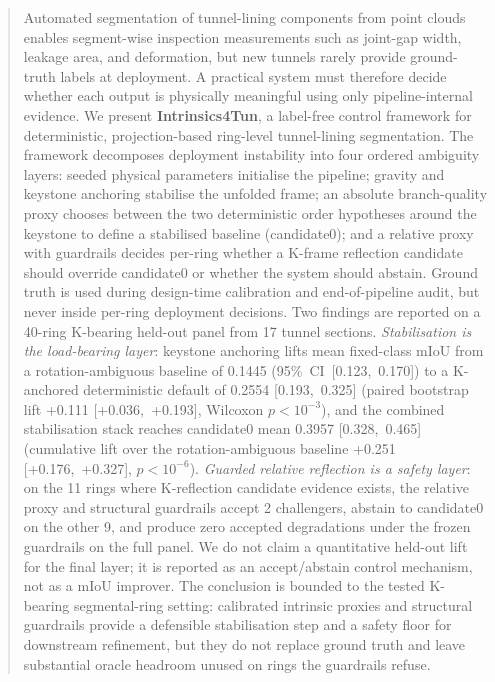 \documentclass[a4paper,fleqn]{cas-dc}
\begin{document}
{\begin{abstract}
Automated segmentation of tunnel-lining components from point clouds enables segment-wise inspection measurements such as joint-gap width, leakage area, and deformation, but new tunnels rarely provide ground-truth labels at deployment. A practical system must therefore decide whether each output is physically meaningful using only pipeline-internal evidence. We present \textbf{Intrinsics4Tun}, a label-free control framework for deterministic, projection-based ring-level tunnel-lining segmentation. The framework decomposes deployment instability into four ordered ambiguity layers: seeded physical parameters initialise the pipeline; gravity and keystone anchoring stabilise the unfolded frame; an absolute branch-quality proxy chooses between the two deterministic order hypotheses around the keystone to define a stabilised baseline (candidate0); and a relative proxy with guardrails decides per-ring whether a K-frame reflection candidate should override candidate0 or whether the system should abstain. Ground truth is used during design-time calibration and end-of-pipeline audit, but never inside per-ring deployment decisions. Two findings are reported on a 40-ring K-bearing held-out panel from 17 tunnel sections. \emph{Stabilisation is the load-bearing layer}: keystone anchoring lifts mean fixed-class mIoU from a rotation-ambiguous baseline of 0.1445 (95\%~CI~[0.123,~0.170]) to a K-anchored deterministic default of 0.2554 [0.193,~0.325] (paired bootstrap lift +0.111 [+0.036,~+0.193], Wilcoxon $p<10^{-3}$), and the combined stabilisation stack reaches candidate0 mean 0.3957 [0.328,~0.465] (cumulative lift over the rotation-ambiguous baseline +0.251 [+0.176,~+0.327], $p<10^{-6}$). \emph{Guarded relative reflection is a safety layer}: on the 11 rings where K-reflection candidate evidence exists, the relative proxy and structural guardrails accept 2 challengers, abstain to candidate0 on the other 9, and produce zero accepted degradations under the frozen guardrails on the full panel. We do not claim a quantitative held-out lift for the final layer; it is reported as an accept/abstain control mechanism, not as a mIoU improver. The conclusion is bounded to the tested K-bearing segmental-ring setting: calibrated intrinsic proxies and structural guardrails provide a defensible stabilisation step and a safety floor for downstream refinement, but they do not replace ground truth and leave substantial oracle headroom unused on rings the guardrails refuse.
\end{abstract}


}
\end{document}

